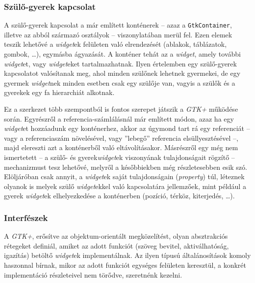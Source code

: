 \subsubsection{Szülő-gyerek kapcsolat}

A szülő-gyerek kapcsolat a már említett konténerek -- azaz a \texttt{GtkContainer}, illetve az abból származó osztályok -- viszonylatában merül fel. Ezen elemek teszik lehetővé a \textit{widget}ek felületen való elrendezését (ablakok, táblázatok, gombok, \dots), egymásba ágyazását. A konténer tehát az a \textit{widget}, amely további \textit{widget}et, vagy \textit{widget}eket tartalmazhatnak. Ilyen értelemben egy szülő-gyerek kapcsolatot valósítanak meg, ahol minden szülőnek lehetnek gyermekei, de egy gyermek \textit{widget}nek minden esetben csak egy szülője van, vagyis a szülők és a gyerekek egy fa hierarchiát alkotnak.

Ez a szerkezet több szempontból is fontos szerepet játszik a \textit{GTK+} működése során. Egyrészről a referencia-számlálásnál már említett módon, azaz ha egy \textit{widget}et hozzáadunk egy konténerhez, akkor az úgymond tart rá egy referenciát -- vagy a referenciaszám növelésével, vagy ''lebegő'' referencia elsüllyesztésével --, majd elereszti azt a konténerből való eltávolításakor. Másrészről egy még nem ismertetett -- a szülő- és gyerek\textit{widget}ek viszonyának tulajdonságait rögzítő -- mechanizmust tesz lehetővé, melyről a későbbiekben még részletesebben esik szó. Elöljáróban csak annyit, a \textit{widget}ek saját tulajdonságain (\textit{property}) túl, léteznek olyanok is melyek szülő \textit{widget}ekkel való kapcsolatára jellemzőek, mint például a gyerek \textit{widget}ek elhelyezkedése a konténerben (pozíció, térköz, kiterjedés, \dots).

\subsubsection{Interfészek}

A \textit{GTK+}, erősítve az objektum-orientált megközelítést, olyan absztrakciós rétegeket definiál, amiket az adott funkciót (szöveg bevitel, aktiválhatóság, igazítás) betöltő \textit{widget}ek implementálnak. Az ilyen típusú általánosítások komoly haszonnal bírnak, mikor az adott funkciót egységes felületen keresztül, a konkrét implementáció részleteivel nem törődve, szeretnénk kezelni.


